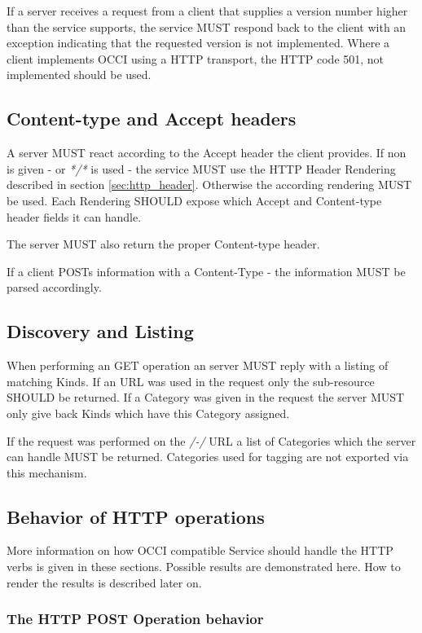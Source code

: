 \documentclass[10pt,a4paper]{article}
\begin{document}
If a server receives a request from a client that supplies a version number higher than the service supports, the service MUST respond back to the client with an exception indicating that the requested version is not implemented. Where a client implements OCCI using a HTTP transport, the HTTP code 501, not implemented should be used. 

\subsection{Content-type and Accept headers}
A server MUST react according to the Accept header the client provides. If non is given - or \textit{*/*} is used - the service MUST use the HTTP Header Rendering described in section \ref{sec:http_header}. Otherwise the according rendering MUST be used. Each Rendering SHOULD expose which Accept and Content-type header fields it can handle.

The server MUST also return the proper Content-type header. 

If a client POSTs information with a Content-Type - the information MUST be parsed accordingly.

\subsection{Discovery and Listing}
When performing an GET operation an server MUST reply with a listing of matching Kinds. If an URL was used in the request only the sub-resource SHOULD be returned. If a Category was given in the request the server MUST only give back Kinds which have this Category assigned.

If the request was performed on the \textit{/-/} URL a list of Categories which the server can handle MUST be returned. Categories used for tagging are not exported via this mechanism.

\subsection{Behavior of HTTP operations}

More information on how OCCI compatible Service should handle the HTTP verbs is given in these sections. Possible results are demonstrated here. How to render the results is described later on.

\subsubsection{The HTTP POST Operation behavior}
\end{document}
